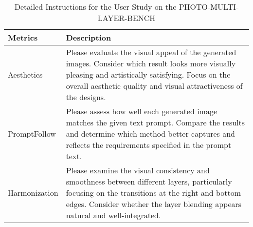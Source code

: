 \begin{table*}[t]
\begin{minipage}{\textwidth}
    \centering
    \small
    \begin{tabular}{p{}|p{}}
    \textbf{Metrics} & \textbf{Description} \\
    \hline
    Aesthetics & Please evaluate the visual appeal of the generated images. Consider which result looks more visually pleasing and artistically satisfying. Focus on the overall aesthetic quality and visual attractiveness of the designs. \\
    \hline
    PromptFollow & Please assess how well each generated image matches the given text prompt. Compare the results and determine which method better captures and reflects the requirements specified in the prompt text. \\
    \hline
    Harmonization & Please examine the visual consistency and smoothness between different layers, particularly focusing on the transitions at the right and bottom edges. Consider whether the layer blending appears natural and well-integrated. \\
    \end{tabular}
    \vspace{-1mm}
    \caption{Detailed Instructions for the User Study on the \textsc{PHOTO-MULTI-LAYER-BENCH}}
    \label{tab:user_study_prompt_2}
\end{minipage}
\end{table*}







